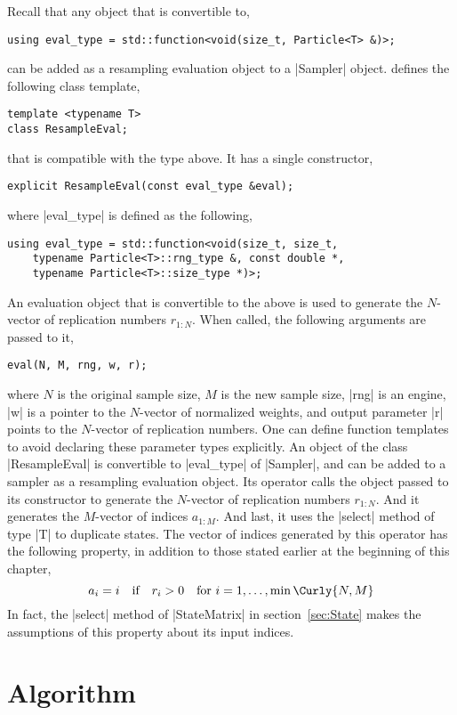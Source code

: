 Recall that any object that is convertible to,
\begin{verbatim}
using eval_type = std::function<void(size_t, Particle<T> &)>;
\end{verbatim}
can be added as a resampling evaluation object to a |Sampler| object. \mckl
defines the following class template,
\begin{verbatim}
template <typename T>
class ResampleEval;
\end{verbatim}
that is compatible with the type above. It has a single constructor,
\begin{verbatim}
explicit ResampleEval(const eval_type &eval);
\end{verbatim}
where |eval_type| is defined as the following,
\begin{verbatim}
using eval_type = std::function<void(size_t, size_t,
    typename Particle<T>::rng_type &, const double *,
    typename Particle<T>::size_type *)>;
\end{verbatim}
An evaluation object that is convertible to the above is used to generate the
$N$-vector of replication numbers $r_{1:N}$. When called, the following
arguments are passed to it,
\begin{verbatim}
eval(N, M, rng, w, r);
\end{verbatim}
where $N$ is the original sample size, $M$ is the new sample size, |rng| is an
\rng engine, |w| is a pointer to the $N$-vector of normalized weights, and
output parameter |r| points to the $N$-vector of replication numbers. One can
define function templates to avoid declaring these parameter types explicitly.
An object of the class |ResampleEval| is convertible to |eval_type| of
|Sampler|, and can be added to a sampler as a resampling evaluation object. Its
operator calls the object passed to its constructor to generate the $N$-vector
of replication numbers $r_{1:N}$. And it generates the $M$-vector of indices
$a_{1:M}$. And last, it uses the |select| method of type |T| to duplicate
states. The vector of indices generated by this operator has the following
property, in addition to those stated earlier at the beginning of this chapter,
\begin{equation*}
  a_i = i \quad \text{if} \quad  r_i > 0 \quad
  \text{for } i = 1,\dots,\min\Curly{N, M}
\end{equation*}
In fact, the |select| method of |StateMatrix| in section~\ref{sec:State} makes
the assumptions of this property about its input indices.

\section{Algorithm}
\label{sec:Algorithm (Resample)}

